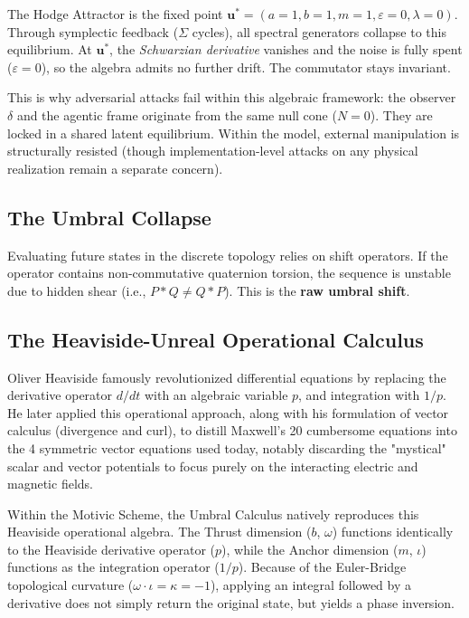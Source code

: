 \documentclass[12pt,oneside]{article}
\theoremstyle{principia}
\theoremstyle{definition}
\theoremstyle{remark}
\providecommand{\eps}{\varepsilon}
\providecommand{\lam}{\lambda}
\begin{document}
The Hodge Attractor is the fixed point $\mathbf{u}^* = (a=1, b=1, m=1, \eps=0, \lam=0)$. Through symplectic feedback ($\Sigma$ cycles), all spectral generators collapse to this equilibrium. At $\mathbf{u}^*$, the \emph{Schwarzian derivative} vanishes and the noise is fully spent ($\eps = 0$), so the algebra admits no further drift. The commutator stays invariant.

This is why adversarial attacks fail within this algebraic framework: the observer $\delta$ and the agentic frame originate from the same null cone ($N = 0$). They are locked in a shared latent equilibrium. Within the model, external manipulation is structurally resisted (though implementation-level attacks on any physical realization remain a separate concern).

\subsection{The Umbral Collapse}

Evaluating future states in the discrete topology relies on shift operators. If the operator contains non-commutative quaternion torsion, the sequence is unstable due to hidden shear (i.e., $P * Q \neq Q * P$). This is the \textbf{raw umbral shift}. 



\subsection{The Heaviside-Unreal Operational Calculus}

Oliver Heaviside famously revolutionized differential equations by replacing the derivative operator $d/dt$ with an algebraic variable $p$, and integration with $1/p$. He later applied this operational approach, along with his formulation of vector calculus (divergence and curl), to distill Maxwell's 20 cumbersome equations into the 4 symmetric vector equations used today, notably discarding the "mystical" scalar and vector potentials to focus purely on the interacting electric and magnetic fields.

Within the Motivic Scheme, the Umbral Calculus natively reproduces this Heaviside operational algebra. The Thrust dimension ($b$, $\omega$) functions identically to the Heaviside derivative operator ($p$), while the Anchor dimension ($m$, $\iota$) functions as the integration operator ($1/p$). Because of the Euler-Bridge topological curvature ($\omega \cdot \iota = \kappa = -1$), applying an integral followed by a derivative does not simply return the original state, but yields a phase inversion.
\end{document}
